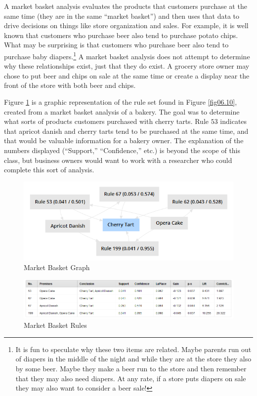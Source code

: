 A market basket analysis evaluates the products that customers purchase at the same time (they are in the same ``market basket'') and then uses that data to drive decisions on things like store organization and sales. For example, it is well known that customers who purchase beer also tend to purchase potato chips. What may be surprising is that customers who purchase beer also tend to purchase baby diapers.\footnote{It is fun to speculate why these two items are related. Maybe parents run out of diapers in the middle of the night and while they are at the store they also by some beer. Maybe they make a beer run to the store and then remember that they may also need diapers. At any rate, if a store puts diapers on sale they may also want to consider a beer sale!} A market basket analysis does not attempt to determine why these relationships exist, just that they do exist. A grocery store owner may chose to put beer and chips on sale at the same time or create a display near the front of the store with both beer and chips. 

Figure \ref{fig06.06} is a graphic representation of the rule set found in Figure \ref{fig06.10}, created from a market basket analysis of a bakery. The goal was to determine what sorts of products customers purchased with cherry tarts. Rule $ 53 $ indicates that apricot danish and cherry tarts tend to be purchased at the same time, and that would be valuable information for a bakery owner. The explanation of the numbers displayed (``Support,'' ``Confidence,'' etc.) is beyond the scope of this class, but business owners would want to work with a researcher who could complete this sort of analysis.

\begin{figure}[H]
	\centering
	\includegraphics[width=\maxwidth{.95\linewidth}]{gfx/06-MarketBasketGraph}
	\caption{Market Basket Graph}
	\label{fig06.06}
\end{figure}


\begin{figure}[H]
	\centering
	\includegraphics[width=\maxwidth{.95\linewidth}]{gfx/06-MarketBasketRules}
	\caption{Market Basket Rules}
	\label{fig06.07}
\end{figure}

